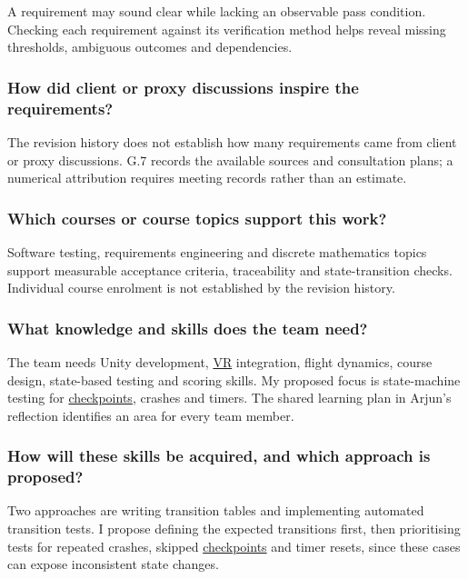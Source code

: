 \documentclass[12pt]{article}
\begin{document}
A requirement may sound clear while lacking an observable pass condition. Checking each requirement against its verification method helps reveal missing thresholds, ambiguous outcomes and dependencies.

\subsubsection*{How did client or proxy discussions inspire the requirements?}

The revision history does not establish how many requirements came from client or proxy discussions. G.7 records the available sources and consultation plans; a numerical attribution requires meeting records rather than an estimate.

\subsubsection*{Which courses or course topics support this work?}

Software testing, requirements engineering and discrete mathematics topics support measurable acceptance criteria, traceability and state-transition checks. Individual course enrolment is not established by the revision history.

\subsubsection*{What knowledge and skills does the team need?}

The team needs Unity development, \hyperlink{glos:VR}{VR} integration, flight dynamics, course design, state-based testing and scoring skills. My proposed focus is state-machine testing for \hyperlink{glos:Checkpoint}{checkpoints}, crashes and timers. The shared learning plan in Arjun's reflection identifies an area for every team member.

\subsubsection*{How will these skills be acquired, and which approach is proposed?}

Two approaches are writing transition tables and implementing automated transition tests. I propose defining the expected transitions first, then prioritising tests for repeated crashes, skipped \hyperlink{glos:Checkpoint}{checkpoints} and timer resets, since these cases can expose inconsistent state changes.
\end{document}
